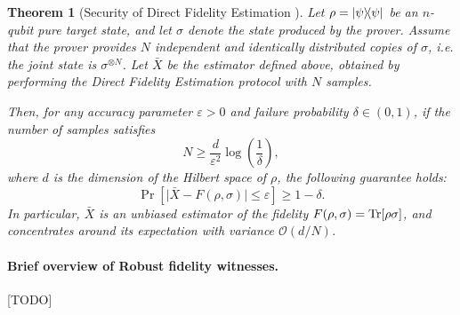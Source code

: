 \documentclass[11pt]{article}
\newtheorem{theorem}{Theorem}
\begin{document}
    \begin{theorem}[Security of Direct Fidelity Estimation \cite{FOS24optimal}]
        \label{thm:dfe_correctness}
        Let $\rho = \ketbra{\psi}$ be an $n$-qubit pure target state, and let $\sigma$ denote the state produced by the prover. 
        Assume that the prover provides $N$ independent and identically distributed copies of $\sigma$, i.e. the joint state is $\sigma^{\otimes N}$. 
        Let $\bar X$ be the estimator defined above, obtained by performing the Direct Fidelity Estimation protocol with $N$ samples.
        
        Then, for any accuracy parameter $\varepsilon > 0$ and failure probability $\delta \in (0,1)$, 
        if the number of samples satisfies
        \begin{equation}
            N \geq \frac{d}{\varepsilon^2} \log\!\left(\frac{1}{\delta}\right),
        \end{equation}
        where $d$ is the dimension of the Hilbert space of $\rho$, the following guarantee holds:
        \begin{equation}
            \Pr\!\left[
                \big| \bar X - F(\rho,\sigma) \big| \le \varepsilon
            \right]
            \ge 1 - \delta.
        \end{equation}
        In particular, $\bar X$ is an unbiased estimator of the fidelity $F(\rho,\sigma) = \Tr[\rho\sigma]$, and concentrates around its expectation with variance $\mathcal O(d/N)$.
        \end{theorem}
        
\paragraph{Brief overview of Robust fidelity witnesses.} [TODO]
\end{document}
